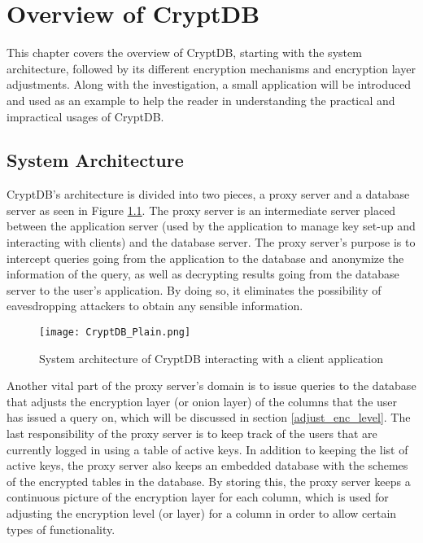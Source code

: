 \chapter{Overview of CryptDB}
\label{chp:overview_cryptDB}

This chapter covers the overview of CryptDB, starting with the system architecture, followed by its different encryption mechanisms and encryption layer adjustments. Along with the investigation, a small application will be introduced and used as an example to help the reader in understanding the practical and impractical usages of CryptDB.

\section{System Architecture}
\label{sec:sysarc}

CryptDB's architecture is divided into two pieces, a proxy server and a database server as seen in Figure \ref{cryptdb_plain}. The proxy server is an intermediate server placed between the application server (used by the application to manage key set-up and interacting with clients) and the database server. The proxy server's purpose is to intercept queries going from the application to the database and anonymize the information of the query, as well as decrypting results going from the database server to the user's application. By doing so, it eliminates the possibility of eavesdropping attackers to obtain any sensible information. %

\begin{figure}[H]
	\texttt{[image: CryptDB\_Plain.png]}
	\caption{System architecture of CryptDB interacting with a client application}
	\label{cryptdb_plain}
\end{figure}

Another vital part of the proxy server's domain is to issue queries to the database that adjusts the encryption layer (or onion layer) of the columns that the user has issued a query on, which will be discussed in section \ref{adjust_enc_level}. The last responsibility of the proxy server is to keep track of the users that are currently logged in using a table of active keys. In addition to keeping the list of active keys, the proxy server also keeps an embedded database with the schemes of the encrypted tables in the database. By storing this, the proxy server keeps a continuous picture of the encryption layer for each column, which is used for adjusting the encryption level (or layer) for a column in order to allow certain types of functionality.

